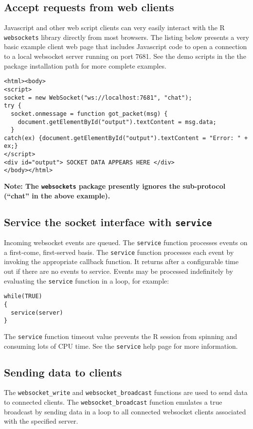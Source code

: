 \documentclass[12pt]{article}
\begin{document}
\subsection{Accept requests from web clients}
Javascript and other web script clients can very easily interact with the
R {\tt websockets} library directly from most browsers. The listing below
presents a very basic example client web page that includes Javascript
code to open a connection to a local websocket server running on port
7681. See the demo scripts in the
the package installation path for more complete examples.
\begin{lstlisting}
<html><body>
<script>
socket = new WebSocket("ws://localhost:7681", "chat");
try {
  socket.onmessage = function got_packet(msg) {
    document.getElementById("output").textContent = msg.data;
  } 
catch(ex) {document.getElementById("output").textContent = "Error: " + ex;}
</script>
<div id="output"> SOCKET DATA APPEARS HERE </div>
</body></html>
\end{lstlisting}
{\bf Note: The {\tt websockets} package presently ignores the
sub-protocol (``chat'' in the above example).}

\subsection{Service the socket interface with {\tt service}}

Incoming websocket events are queued. The {\tt service} function
processes events on a first-come, first-served basis.
The {\tt service} function processes each event by invoking the
appropriate callback function.
It returns after a configurable time out if there are no events to service.
Events may be processed indefinitely by evaluating the {\tt service} function
in a loop, for example:
\begin{lstlisting}
while(TRUE)
{
  service(server)
}
\end{lstlisting}
The {\tt service} function timeout value
prevents the R session from spinning and consuming lots of CPU time. See the
{\tt service} help page for more information.

\subsection{Sending data to clients}
The {\tt websocket\_write} and {\tt websocket\_broadcast} functions are
used to send data to connected clients. The {\tt websocket\_broadcast} function
emulates a true broadcast by sending data in a loop to all connected websocket
clients associated with the specified server. 
\end{document}
